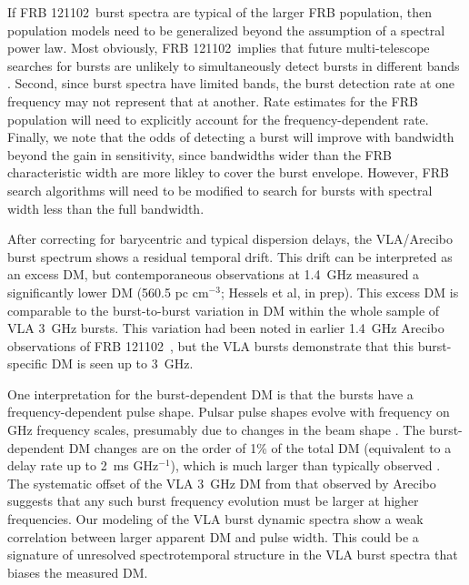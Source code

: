 \documentclass[twocolumn]{aastex61}
\newcommand{\frb}{FRB 121102}
\begin{document}
If \frb\ burst spectra are typical of the larger FRB population, then population models need to be generalized beyond the assumption of a spectral power law. Most obviously, \frb\ implies that future multi-telescope searches for bursts are unlikely to simultaneously detect bursts in different bands \citep[c.f.][]{1999ApJ...517..460S}. Second, since burst spectra have limited bands, the burst detection rate at one frequency may not represent that at another. Rate estimates for the FRB population will need to explicitly account for the frequency-dependent rate. Finally, we note that the odds of detecting a burst will improve with bandwidth beyond the gain in sensitivity, since bandwidths wider than the FRB characteristic width are more likley to cover the burst envelope. However, FRB search algorithms will need to be modified to search for bursts with spectral width less than the full bandwidth.

After correcting for barycentric and typical dispersion delays, the VLA/Arecibo burst spectrum shows a residual temporal drift. This drift can be interpreted as an excess DM, but contemporaneous observations at 1.4~GHz measured a significantly lower DM (560.5 pc cm$^{-3}$; Hessels et al, in prep). This excess DM is comparable to the burst-to-burst variation in DM within the whole sample of VLA 3~GHz bursts. This variation had been noted in earlier 1.4~GHz Arecibo observations of \frb\ \citep{2016arXiv160308880S}, but the VLA bursts demonstrate that this burst-specific DM is seen up to 3~GHz.

One interpretation for the burst-dependent DM is that the bursts have a frequency-dependent pulse shape. Pulsar pulse shapes evolve with frequency on GHz frequency scales, presumably due to changes in the beam shape \citep{1988MNRAS.234..477L}. The burst-dependent DM changes are on the order of 1\% of the total DM (equivalent to a delay rate up to 2~ms GHz$^{-1}$), which is much larger than typically observed \citep{2017MNRAS.466.3706L}. The systematic offset of the VLA 3~GHz DM from that observed by Arecibo suggests that any such burst frequency evolution must be larger at higher frequencies. Our modeling of the VLA burst dynamic spectra show a weak correlation between larger apparent DM and pulse width. This could be a signature of unresolved spectrotemporal structure in the VLA burst spectra that biases the measured DM.

\end{document}

